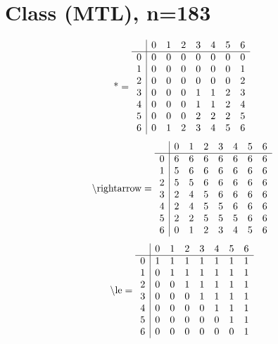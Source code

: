 \documentclass[11pt]{article}
\begin{document}
\section{Class (MTL), n=183}
\[\text{*} = 
\begin{array}{r | r r r r r r r}
 & 0 & 1 & 2 & 3 & 4 & 5 & 6 \\ \hline
0 & 0 & 0 & 0 & 0 & 0 & 0 & 0 \\
1 & 0 & 0 & 0 & 0 & 0 & 0 & 1 \\
2 & 0 & 0 & 0 & 0 & 0 & 0 & 2 \\
3 & 0 & 0 & 0 & 1 & 1 & 2 & 3 \\
4 & 0 & 0 & 0 & 1 & 1 & 2 & 4 \\
5 & 0 & 0 & 0 & 2 & 2 & 2 & 5 \\
6 & 0 & 1 & 2 & 3 & 4 & 5 & 6 \\
\end{array}
\]
\[\text{\textbackslash rightarrow} = 
\begin{array}{r | r r r r r r r}
 & 0 & 1 & 2 & 3 & 4 & 5 & 6 \\ \hline
0 & 6 & 6 & 6 & 6 & 6 & 6 & 6 \\
1 & 5 & 6 & 6 & 6 & 6 & 6 & 6 \\
2 & 5 & 5 & 6 & 6 & 6 & 6 & 6 \\
3 & 2 & 4 & 5 & 6 & 6 & 6 & 6 \\
4 & 2 & 4 & 5 & 5 & 6 & 6 & 6 \\
5 & 2 & 2 & 5 & 5 & 5 & 6 & 6 \\
6 & 0 & 1 & 2 & 3 & 4 & 5 & 6 \\
\end{array}
\]
\[\text{\textbackslash le} = 
\begin{array}{r | r r r r r r r}
 & 0 & 1 & 2 & 3 & 4 & 5 & 6 \\ \hline
0 & 1 & 1 & 1 & 1 & 1 & 1 & 1 \\
1 & 0 & 1 & 1 & 1 & 1 & 1 & 1 \\
2 & 0 & 0 & 1 & 1 & 1 & 1 & 1 \\
3 & 0 & 0 & 0 & 1 & 1 & 1 & 1 \\
4 & 0 & 0 & 0 & 0 & 1 & 1 & 1 \\
5 & 0 & 0 & 0 & 0 & 0 & 1 & 1 \\
6 & 0 & 0 & 0 & 0 & 0 & 0 & 1 \\
\end{array}
\]
\end{document}
